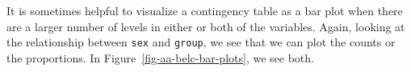 \documentclass[
  letterpaper,
]{latex/krantz}
\theoremstyle{definition}
\theoremstyle{remark}
\begin{document}
It is sometimes helpful to visualize a contingency table as a bar plot
when there are a larger number of levels in either or both of the
variables. Again, looking at the relationship between \texttt{sex} and
\texttt{group}, we see that we can plot the counts or the proportions.
In Figure~\ref{fig-aa-belc-bar-plots}, we see both.

\begin{figure}[H]

\begin{minipage}{0.50\linewidth}



\end{minipage}%
%
\begin{minipage}{0.50\linewidth}

\centering{

}
\end{minipage}
\end{figure}
\end{document}
